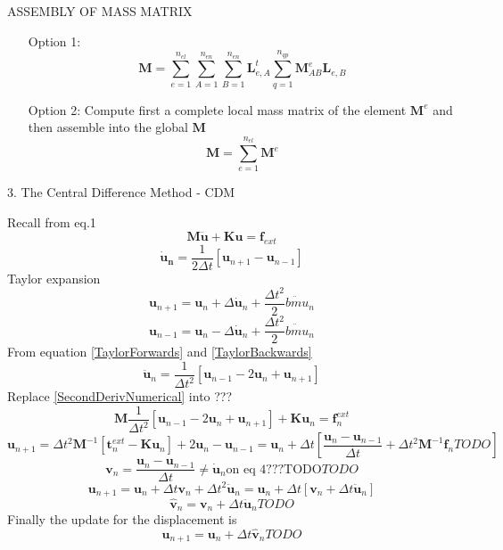 \documentclass[10pt,a4paper]{article}
\begin{document}
ASSEMBLY OF MASS MATRIX
\begin{itemize}
\item[Option 1:]
\[ \bm M = \sum_{e=1}^{n_{el}} \sum_{A=1}^{n_{en}} \sum_{B=1}^{n_{en}} \bm L_{e,A}^t \sum_{q=1}^{n_{qp}} \bm M_{AB}^e \bm L_{e,B} \]
\item[Option 2:] Compute first a complete local mass matrix of the element $\bm M^e$ and then assemble into the global $\bm M$
\[ \bm M = \sum_{e=1}^{n_{el}} \bm M^e \]
\end{itemize}

3. The Central Difference Method - CDM

Recall from eq.1 %
\[ \bm M \bm{\ddot{u}} + \bm K \bm u = \bm f_{ext} \]
\begin{equation}
\bm{\dot{u}_n} = \frac{1}{2 \Delta t} [ \bm u_{n+1} - \bm u_{n-1} ]
\label{eq:FirstDerivNumerical}
\end{equation}
Taylor expansion
\begin{equation}
\bm u_{n+1} = \bm u_n + \Delta \dot{\bm u}_n + \frac{\Delta t^2}{2} \ddot{bm u}_n
\label{TaylorForwards}
\end{equation}
\begin{equation}
\bm u_{n-1} = \bm u_n - \Delta \dot{\bm u}_n + \frac{\Delta t^2}{2} \ddot{bm u}_n
\label{TaylorBackwards}
\end{equation}
From equation \ref{TaylorForwards} and \ref{TaylorBackwards}
\begin{equation}
\bm{\ddot{u}}_n = \frac{1}{\Delta t^2} [\bm u_{n-1} - 2 \bm u_n + \bm u_{n+1}]
\label{SecondDerivNumerical}
\end{equation}
Replace \ref{SecondDerivNumerical} into ???
\[ \bm M \frac{1}{\Delta t^2} [ \bm u_{n-1} - 2 \bm u_n + \bm u_{n+1}] + \bm K \bm u_n = \bm f_n^{ext} \]
\begin{equation}
\bm u_{n+1} = \Delta t^2 \bm M^{-1} [ \bm t_n^{ext} - \bm K \bm u_n ] + 2 \bm u_n - \bm u_{n-1}
= \bm u_n + \Delta t \left[ \frac{\bm u_n - \bm u_{n-1}}{\Delta t} + \Delta t^2 \bm M^{-1} \bm f_n
TODO \right]
\label{keineAhnungWas1}
\end{equation}
\begin{equation}
\bm v_n = \frac{\bm u_n - \bm u_{n-1}}{\Delta t} \neq \bm{\dot{u}}_n \text{on eq 4???TODO}
TODO
\label{keineAhnungWas2}
\end{equation}
\[ \bm u_{n+1} = \bm u_n + \Delta t \bm v_n + \Delta t^2 \bm{\ddot{u}}_n
= \bm u_n + \Delta t [ \bm v_n + \Delta t \bm{\ddot{u}}_n ] \]
\begin{equation}
\bm \hat{v}_n = \bm v_n + \Delta t \bm{\ddot{u}}_n
TODO
\label{keineAhnungWas3}
\end{equation}
Finally the update for the displacement is
\begin{equation}
\bm u_{n+1} = \bm u_n + \Delta t \bm{\hat{v}}_n
TODO
\label{keineAhnungWas4}
\end{equation}
\end{document}
